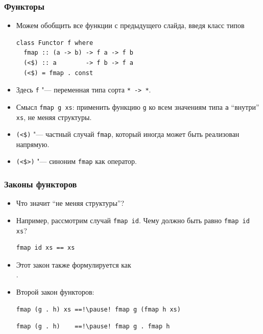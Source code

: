 \documentclass[11pt]{beamer}
\begin{document}
\begin{frame}[fragile]
\frametitle{Функторы}
\begin{itemize}
    \item Можем обобщить все функции с предыдущего слайда, введя класс типов
\begin{lstlisting}
class Functor f where
  fmap :: (a -> b) -> f a -> f b
  (<$) :: a        -> f b -> f a
  (<$) = fmap . const
\end{lstlisting}
    \item Здесь \lstinline|f| "--- переменная типа сорта \pause \lstinline|* -> *|.
    \item Смысл \lstinline|fmap g xs|: применить функцию \lstinline|g| ко всем значениям типа \lstinline|a| \enquote{внутри} \lstinline|xs|, не меняя структуры.
    \item \lstinline|(<$)| "--- частный случай \lstinline|fmap|, который иногда может быть реализован напрямую.
    \pause
    \item \lstinline|(<$>)| "--- синоним \lstinline|fmap| как оператор.
\end{itemize}
\end{frame}

\begin{frame}[fragile]
\frametitle{Законы функторов}
\begin{itemize}
    \item Что значит \enquote{не меняя структуры}?
    \item Например, рассмотрим случай \lstinline|fmap id|. Чему должно быть равно \lstinline|fmap id xs|? \pause
\begin{lstlisting}
fmap id xs == xs
\end{lstlisting}
    \pause
    \item Этот закон также формулируется как \\ . \pause
    \item Второй закон функторов:
\begin{lstlisting}
fmap (g . h) xs ==!\pause! fmap g (fmap h xs)
\end{lstlisting}
\pause
\begin{lstlisting}
fmap (g . h)    ==!\pause! fmap g . fmap h
\end{lstlisting}
\end{itemize}
\end{frame}
\end{document}
